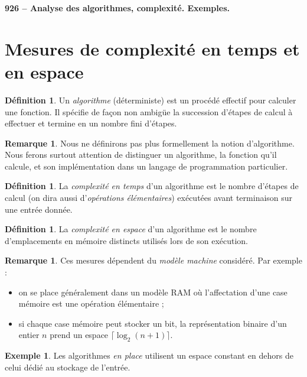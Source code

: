 \documentclass[a5paper, 10pt]{article}
\theoremstyle{definition}
\newtheorem{definition}[equation]{Définition}
\newtheorem{example}[equation]{Exemple}
\newtheorem{remark}[equation]{Remarque}
\newcounter{n}
\newcommand\lesson[1]{{\noindent \LARGE \bfseries #1}\\[1pt]}
\begin{document}
\author{\textsc{Nguyễn} Lê Thành Dũng}

\lesson{926 -- Analyse des algorithmes, complexité. Exemples.}

\section{Mesures de complexité en temps et en espace}

\begin{definition}
  Un \emph{algorithme} (déterministe) est un procédé effectif pour calculer une
  fonction. Il spécifie de façon non ambigüe la succession d'étapes de calcul à
  effectuer et termine en un nombre fini d'étapes.
\end{definition}

\begin{remark}
  Nous ne définirons pas plus formellement la notion d'algorithme. Nous ferons
  surtout attention de distinguer un algorithme, la fonction qu'il calcule, et
  son implémentation dans un langage de programmation particulier.
\end{remark}

\begin{definition}
  La \emph{complexité en temps} d'un algorithme est le nombre d'étapes de calcul
  (on dira aussi d'\emph{opérations élémentaires}) exécutées avant terminaison
  sur une entrée donnée.
\end{definition}
\begin{definition}
  La \emph{complexité en espace} d'un algorithme est le nombre d'emplacements en
  mémoire distincts utilisés lors de son exécution.
\end{definition}

\begin{remark}
  Ces mesures dépendent du \emph{modèle machine} considéré. Par exemple :
  \begin{itemize}
  \item on se place généralement dans un modèle RAM où l'affectation d'une case
    mémoire est une opération élémentaire ;
  \item si chaque case mémoire peut stocker un bit, la représentation binaire
    d'un entier $n$ prend un espace $\lceil \log_2 (n+1) \rceil$.
  \end{itemize}
\end{remark}

\begin{example}
  Les algorithmes \emph{en place} utilisent un espace constant en dehors de
  celui dédié au stockage de l'entrée.
\end{example}
\end{document}
